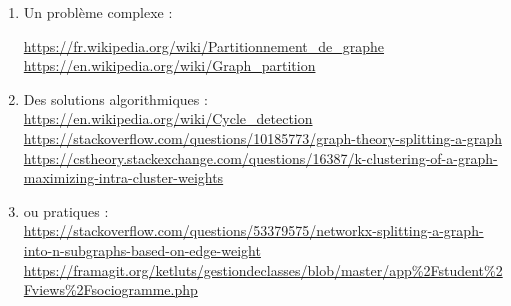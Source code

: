 \documentclass[12pt]{article}
\begin{document}
\begin{enumerate}
    


\item  Un problème complexe :

  \url{ https://fr.wikipedia.org/wiki/Partitionnement_de_graphe}\\
  \url{ https://en.wikipedia.org/wiki/Graph_partition}\\
\medskip
\item Des solutions algorithmiques :\\
\url{https://en.wikipedia.org/wiki/Cycle_detection}\\
  \url{ https://stackoverflow.com/questions/10185773/graph-theory-splitting-a-graph}\\
  \url{ https://cstheory.stackexchange.com/questions/16387/k-clustering-of-a-graph-maximizing-intra-cluster-weights}
\medskip
\item ou pratiques :\\
   \url{ https://stackoverflow.com/questions/53379575/networkx-splitting-a-graph-into-n-subgraphs-based-on-edge-weight}\\
   \url{ https://framagit.org/ketluts/gestiondeclasses/blob/master/app%2Fstudent%2Fviews%2Fsociogramme.php}\\ 



\end{enumerate}
\end{document}
